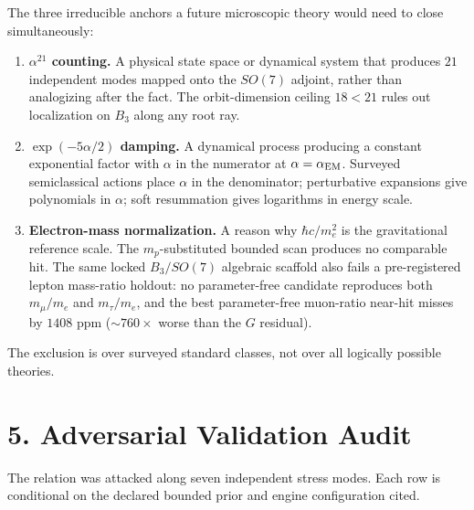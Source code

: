 \documentclass[
  11pt,
  letterpaper,
  twocolumn,
]{article}
\providecommand{\tightlist}{%
  \setlength{\itemsep}{0pt}\setlength{\parskip}{0pt}}
\providecommand{\tightlist}{\setlength{\itemsep}{0pt}\setlength{\parskip}{0pt}}
\begin{document}
The three irreducible anchors a future microscopic theory would need to
close simultaneously:

\begin{enumerate}
\def\labelenumi{\arabic{enumi}.}
\tightlist
\item
  \textbf{\(\alpha^{21}\) counting.} A physical state space or dynamical
  system that produces \(21\) independent modes mapped onto the
  \(SO(7)\) adjoint, rather than analogizing after the fact. The
  orbit-dimension ceiling \(18 < 21\) rules out localization on \(B_3\)
  along any root ray.
\item
  \textbf{\(\exp(-5\alpha/2)\) damping.} A dynamical process producing a
  constant exponential factor with \(\alpha\) in the numerator at
  \(\alpha = \alpha_{\rm EM}\). Surveyed semiclassical actions place
  \(\alpha\) in the denominator; perturbative expansions give
  polynomials in \(\alpha\); soft resummation gives logarithms in energy
  scale.
\item
  \textbf{Electron-mass normalization.} A reason why \(\hbar c/m_e^2\)
  is the gravitational reference scale. The \(m_p\)-substituted bounded
  scan produces no comparable hit. The same locked \(B_3/SO(7)\)
  algebraic scaffold also fails a pre-registered lepton mass-ratio
  holdout: no parameter-free candidate reproduces both \(m_\mu/m_e\) and
  \(m_\tau/m_e\), and the best parameter-free muon-ratio near-hit misses
  by \(1408\) ppm (\(\sim\!760\times\) worse than the \(G\) residual).
\end{enumerate}

The exclusion is over surveyed standard classes, not over all logically
possible theories.

\section{5. Adversarial Validation
Audit}\label{adversarial-validation-audit}

The relation was attacked along seven independent stress modes. Each row
is conditional on the declared bounded prior and engine configuration
cited.
\end{document}
